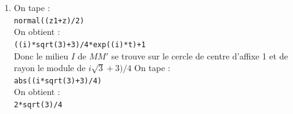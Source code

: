 \documentclass[a4paper,11pt]{book}
\begin{document}
\begin{enumerate}
\begin{itemize}
de rayon 1 se trouvant dans le demi-plan $y>0$.\\
Le point $A$ a pour affixe 1 et le point $A'$ a pour affixe $2+\exp(i\pi/3)$
On tape :\\
{\tt A1:=point(2+exp(i*pi/3))}\\
{\tt affixe(A1)}\\  
On obtient :\\
{\tt 5/2+((i)*sqrt(3))/2}\\  
Ou on tape dans un niveau de g\'eom\'etrie:\\
{\tt c1:=cercle(2,1);}\\
{\tt d1:=droite(2,3+i*sqrt(3));}\\
{\tt A1:=inter(c1,d1)[0]}\\
{\tt affixe(A1)}\\  
On obtient :\\
{\tt ((i)*sqrt(3)+5)/2}\\ 
\item[$b)$]  Si le point $M$ a pour affixe : $z=\exp(it)$, alors le point $M'$ a pour 
affixe $z'=2+\exp(i(t+\frac{\pi}{3}))$.\\
Donc $\frac{z'-2}{z}=\exp(i\frac{\pi}{3})=(1+i*\sqrt 3)/2$
$\frac{z'-2}{z}$ a donc pour module 1 et comme argument $\frac{\pi}{3}$.\\
On tape :\\
{\tt z:=exp(i*t)}\\
{\tt z1:=2+exp(i*t+i*pi/3)}\\
{\tt normal((z1-2)/z)}\\
On obtient :\\
{\tt ((i)*sqrt(3)+1)/2}
 
\item[$c)$] $r$ est le produit d'une rotation d'angle $frac{\pi}{3}$ et d'une translation : c'est donc une rotation d'angle $frac{\pi}{3}$ et de centre le point fixe
On tape :\\
{\tt csolve(z=exp(i*pi/3)*z+2,z)}\\
On obtient :\\
{\tt [4/((-i)*sqrt(3)+1)]} 
\end{itemize}
\item 
On tape :\\
{\tt normal((z1+z)/2)}\\
On obtient :\\
{\tt ((i)*sqrt(3)+3)/4*exp((i)*t)+1}\\  
Donc le milieu $I$ de $MM'$ se trouve sur le cercle de centre d'affixe 1 et de 
rayon le module de $i\sqrt 3+3)/4$
On tape :\\
{\tt abs((i*sqrt(3)+3)/4)}\\
On obtient :\\
{\tt 2*sqrt(3)/4}  
\end{enumerate}
\end{document}
